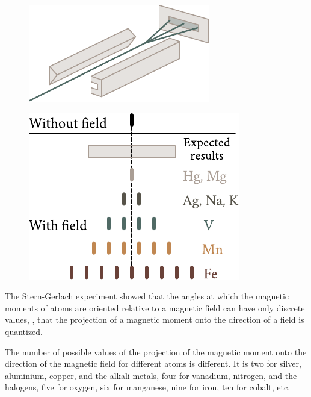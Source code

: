 \begin{figure}[t]
	\begin{minipage}[t]{0.45\linewidth}
		\begin{center}
			\includegraphics[scale=1]{figures/ch_07/fig_7_12.pdf}
			\caption[]{}
			\label{fig:7_12}
		\end{center}
	\end{minipage}
	\hfill{ }%
	\begin{minipage}[t]{0.52\linewidth}
		\begin{center}
			\includegraphics[scale=1]{figures/ch_07/fig_7_13.pdf}
			\caption[]{}
			\label{fig:7_13}
		\end{center}
	\end{minipage}
\vspace{-0.4cm}
\end{figure}

The Stern-Gerlach experiment showed that the angles at which the magnetic moments of atoms are oriented relative to a magnetic field can have only discrete values, \ie, that the projection of a magnetic moment onto the direction of a field is quantized.

The number of possible values of the projection of the magnetic moment onto the direction of the magnetic field for different atoms is different.
It is two for silver, aluminium, copper, and the alkali metals, four for vanadium, nitrogen, and the halogens, five for oxygen, six for manganese, nine for iron, ten for cobalt, etc.


